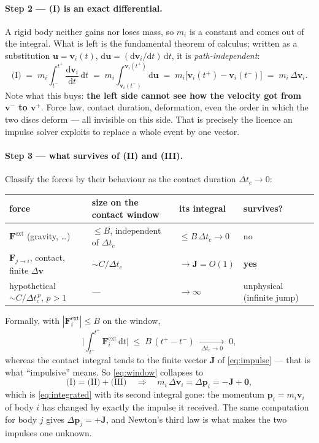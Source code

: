 \documentclass[a4paper,11pt]{article}
\newcommand{\vV}{\bm{v}}
\newcommand{\Jimp}{\bm{J}}
\newcommand{\pp}{\bm{p}}          %
\newcommand{\dtc}{\Delta t_c}     %
\newcommand{\dd}{\mathrm{d}}
\begin{document}
\paragraph{Step 2 --- (I) is an exact differential.}
A rigid body neither gains nor loses mass, so $m_i$ is a constant and comes out
of the integral. What is left is the fundamental theorem of calculus; written as
a substitution $\bm u=\vV_i(t)$, $\dd\bm u=(\dd\vV_i/\dd t)\,\dd t$, it is
\emph{path-independent}:
\begin{equation}
  \text{(I)}\;=\;m_i\int_{t^-}^{t^+}\frac{\dd\vV_i}{\dd t}\,\dd t
  \;=\;m_i\!\int_{\vV_i(t^-)}^{\vV_i(t^+)}\!\!\dd\bm u
  \;=\;m_i\bigl[\vV_i(t^+)-\vV_i(t^-)\bigr]
  \;=\;m_i\,\Delta\vV_i .
  \label{eq:ftc}
\end{equation}
Note what this buys: \textbf{the left side cannot see how the velocity got from
$\vV^-$ to $\vV^+$}. Force law, contact duration, deformation, even the order in
which the two discs deform --- all invisible on this side. That is precisely the
licence an impulse solver exploits to replace a whole event by one vector.

\paragraph{Step 3 --- what survives of (II) and (III).}
Classify the forces by their behaviour as the contact duration $\dtc\to0$:
\begin{center}
\scriptsize
\begin{tabular}{@{}llll@{}}
\toprule
force & size on the contact window & its integral & survives? \\
\midrule
$\bm F^{\text{ext}}$ (gravity, \dots) & $\le B$, independent of $\dtc$
  & $\le B\,\dtc\to0$ & no \\
$\bm F_{j\to i}$, contact, finite $\Delta\vV$ & $\sim C/\dtc$
  & $\to\Jimp=O(1)$ & \textbf{yes} \\
hypothetical $\sim C/\dtc^{\,p}$, $p>1$ & --- & $\to\infty$ & unphysical
  (infinite jump) \\
\bottomrule
\end{tabular}
\end{center}
Formally, with $|\bm F_i^{\text{ext}}|\le B$ on the window,
\[
  \biggl|\int_{t^-}^{t^+}\bm F_i^{\text{ext}}\,\dd t\biggr|
  \;\le\; B\,(t^+-t^-)\;\xrightarrow[\ \dtc\to0\ ]{\ }\;0 ,
\]
whereas the contact integral tends to the finite vector $\Jimp$
of \eqref{eq:impulse} --- that is what ``impulsive'' means. So \eqref{eq:window}
collapses to
\[
  \text{(I)}=\text{(II)}+\text{(III)}
  \quad\Longrightarrow\quad
  m_i\,\Delta\vV_i=\Delta\pp_i=-\Jimp+\bm 0 ,
\]
which is \eqref{eq:integrated} with its second integral gone: the momentum
$\pp_i=m_i\vV_i$ of body $i$ has changed by exactly the impulse it received.
The same computation for body $j$ gives $\Delta\pp_j=+\Jimp$, and Newton's
third law is what makes the two impulses one unknown.
\end{document}
